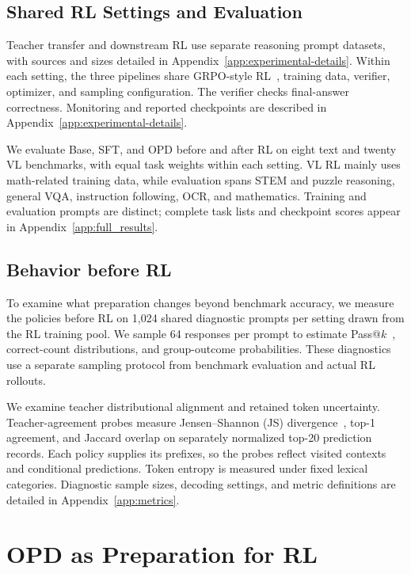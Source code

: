 \documentclass[]{jingdong}
\theoremstyle{plain}
\theoremstyle{definition}
\theoremstyle{remark}
\begin{document}
\subsection{Shared RL Settings and Evaluation}
Teacher transfer and downstream RL use separate reasoning prompt datasets, with sources and sizes detailed in Appendix~\ref{app:experimental-details}. Within each setting, the three pipelines share GRPO-style RL~\citep{grpo}, training data, verifier, optimizer, and sampling configuration. The verifier checks final-answer correctness. Monitoring and reported checkpoints are described in Appendix~\ref{app:experimental-details}.

We evaluate Base, SFT, and OPD before and after RL on eight text and twenty VL benchmarks, with equal task weights within each setting. VL RL mainly uses math-related training data, while evaluation spans STEM and puzzle reasoning, general VQA, instruction following, OCR, and mathematics. Training and evaluation prompts are distinct; complete task lists and checkpoint scores appear in Appendix~\ref{app:full_results}.

\subsection{Behavior before RL}
\label{sec:pre-rl-measurements}
To examine what preparation changes beyond benchmark accuracy, we measure the policies before RL on 1,024 shared diagnostic prompts per setting drawn from the RL training pool. We sample 64 responses per prompt to estimate Pass@$k$~\citep{chen2021codex,lewkowycz2022minerva}, correct-count distributions, and group-outcome probabilities. These diagnostics use a separate sampling protocol from benchmark evaluation and actual RL rollouts.

We examine teacher distributional alignment and retained token uncertainty. Teacher-agreement probes measure Jensen--Shannon (JS) divergence~\citep{lin1991jsd}, top-1 agreement, and Jaccard overlap on separately normalized top-20 prediction records. Each policy supplies its prefixes, so the probes reflect visited contexts and conditional predictions. Token entropy is measured under fixed lexical categories. Diagnostic sample sizes, decoding settings, and metric definitions are detailed in Appendix~\ref{app:metrics}.

\section{OPD as Preparation for RL}
\label{sec:endpoints}
\end{document}
